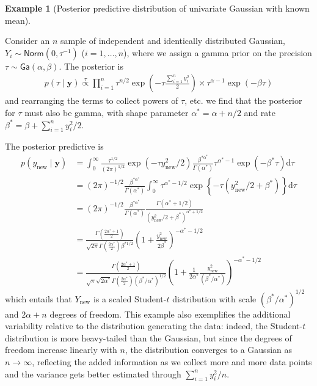 \documentclass[
  11pt,
  letterpaper,
]{scrbook}
\theoremstyle{definition}
\newtheorem{example}{Example}[chapter]
\theoremstyle{definition}
\theoremstyle{definition}
\theoremstyle{plain}
\theoremstyle{remark}
\begin{document}
\begin{example}[Posterior predictive distribution of univariate Gaussian
with known
mean]\protect\hypertarget{exm-normal-post-pred}{}\label{exm-normal-post-pred}

Consider an \(n\) sample of independent and identically distributed
Gaussian, \(Y_i \sim \mathsf{Norm}(0, \tau^{-1})\) (\(i=1, \ldots, n\)),
where we assign a gamma prior on the precision
\(\tau \sim \mathsf{Ga}(\alpha, \beta)\). The posterior is
\begin{align*}
p(\tau \mid \boldsymbol{y}) \stackrel{\tau}{\propto} \prod_{i=1}^n \tau^{n/2}\exp\left(-\tau \frac{\sum_{i=1}^n{y_i^2}}{2}\right) \times \tau^{\alpha-1} \exp(-\beta \tau)
\end{align*} and rearranging the terms to collect powers of \(\tau\),
etc. we find that the posterior for \(\tau\) must also be gamma, with
shape parameter \(\alpha^* = \alpha + n/2\) and rate
\(\beta^* = \beta + \sum_{i=1}^n y_i^2/2\).

The posterior predictive is \begin{align*}
p(y_{\text{new}} \mid \boldsymbol{y}) &= \int_0^\infty \frac{\tau^{1/2}}{(2\pi)^{1/2}}\exp(-\tau y_{\text{new}}^2/2) \frac{\beta^{*\alpha^*}}{\Gamma(\alpha^*)}\tau^{\alpha^*-1}\exp(-\beta^* \tau) \mathrm{d} \tau 
\\&= (2\pi)^{-1/2} \frac{\beta^{*\alpha^*}}{\Gamma(\alpha^*)} \int_0^\infty\tau^{\alpha^*-1/2} \exp\left\{- \tau (y_{\text{new}}^2/2 + \beta^*)\right\} \mathrm{d} \tau
\\&= (2\pi)^{-1/2} \frac{\beta^{*\alpha^*}}{\Gamma(\alpha^*)} \frac{\Gamma(\alpha^* + 1/2)}{(y_{\text{new}}^2/2 + \beta^*)^{\alpha^*+1/2}}
\\&= \frac{\Gamma\left(\frac{2\alpha^* + 1}{2}\right)}{\sqrt{2\pi}\Gamma\left(\frac{2\alpha^*}{2}\right)\beta^{*1/2}} \left( 1+ \frac{y_{\text{new}}^2}{2\beta^*}\right)^{-\alpha^*-1/2}
\\&= \frac{\Gamma\left(\frac{2\alpha^* + 1}{2}\right)}{\sqrt{\pi}\sqrt{ 2\alpha^*}\Gamma\left(\frac{2\alpha^*}{2}\right)(\beta^*/\alpha^*)^{1/2}} \left( 1+ \frac{1}{2\alpha^*}\frac{y_{\text{new}}^2}{(\beta^*/\alpha^*)}\right)^{-\alpha^*-1/2}
\end{align*} which entails that \(Y_{\text{new}}\) is a scaled
Student-\(t\) distribution with scale \((\beta^*/\alpha^*)^{1/2}\) and
\(2\alpha+n\) degrees of freedom. This example also exemplifies the
additional variability relative to the distribution generating the data:
indeed, the Student-\(t\) distribution is more heavy-tailed than the
Gaussian, but since the degrees of freedom increase linearly with \(n\),
the distribution converges to a Gaussian as \(n \to \infty\), reflecting
the added information as we collect more and more data points and the
variance gets better estimated through \(\sum_{i=1}^n y_i^2/n\).

\end{example}
\end{document}
